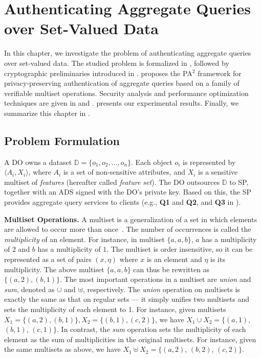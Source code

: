 \chapter{Authenticating Aggregate Queries over Set-Valued Data}\label{chap:aggregate-queries}

In this chapter, we investigate the problem of authenticating aggregate queries over set-valued data. The studied problem is formalized in , followed by cryptographic preliminaries introduced in .  proposes the PA$^2$ framework for privacy-preserving authentication of aggregate queries based on a family of verifiable multiset operations. Security analysis and performance optimization techniques are given in  and .  presents our experimental results. Finally, we summarize this chapter in .

\section{Problem Formulation}\label{sec:aggregate-queries:problem}

A DO owns a dataset $\mathbb{D} = \{o_1, o_2, \dots, o_n\}$. Each object $o_i$ is represented by $\langle A_i, X_i \rangle$, where $A_i$ is a set of non-sensitive attributes, and $X_i$ is a sensitive multiset of \emph{features} (hereafter called \emph{feature set}). The DO outsources $\mathbb{D}$ to SP, together with an ADS signed with the DO's private key. Based on this, the SP provides aggregate query services to clients (e.g., \textbf{Q1} and \textbf{Q2}, and \textbf{Q3} in ).

\textbf{Multiset Operations.} A multiset is a generalization of a set in which elements are allowed to occur more than once~\cite{TAOCP}. The number of occurrences is called the \emph{multiplicity} of an element. For instance, in multiset $\{a, a, b\}$, $a$ has a multiplicity of $2$ and $b$ has a multiplicity of $1$. The multiset is order insensitive, so it can be represented as a set of pairs $(x, \eta)$ where $x$ is an element and $\eta$ is its multiplicity. The above multiset $\{a,a,b\}$ can thus be rewritten as $\{(a,2), (b,1)\}$.
The most important operations in a multiset are \emph{union} and \emph{sum}, denoted as $\cup$ and $\uplus$, respectively. The \emph{union} operation on multisets is exactly the same as that on regular sets --- it simply unifies two multisets and sets the multiplicity of each element to 1. For instance, given multisets $X_1 = \{(a, 2), (b,1)\}, X_2 = \{(b,1), (c, 2)\} $, we have $X_1 \cup X_2 = \{(a,1)$, $(b,1)$, $(c,1)\}$. In contrast, the \emph{sum} operation sets the multiplicity of each element as the sum of multiplicities in the original multisets. For instance, given the same multisets as above, we have $X_1 \uplus X_2 = \{(a, 2)$, $(b, 2)$, $(c, 2)\}$.

